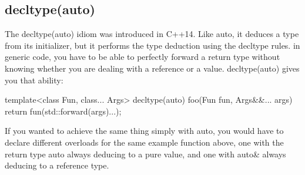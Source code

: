 \documentclass{report}
\begin{document}
 \bigbreak \noindent 
 \subsection{decltype(auto)}
 \bigbreak \noindent 
 The decltype(auto) idiom was introduced in C++14. Like auto, it deduces a type from its initializer, but it performs the type deduction using the decltype rules.
 \bigbreak \noindent 
 in generic code, you have to be able to perfectly
forward a return type without knowing whether you are dealing
with a reference or a value. decltype(auto) gives you that ability:
\bigbreak \noindent 
\begin{cppcode}
template<class Fun, class... Args>
decltype(auto) foo(Fun fun, Args&&... args) {
    return fun(std::forward(args)...);
}
\end{cppcode}
\bigbreak \noindent 
If you wanted to achieve the same thing simply with auto, you
would have to declare different overloads for the same example
function above, one with the return type auto always deducing to
a pure value, and one with auto\& always deducing to a reference
type.

\pagebreak 
{}
\bigbreak \noindent 
\end{document}
